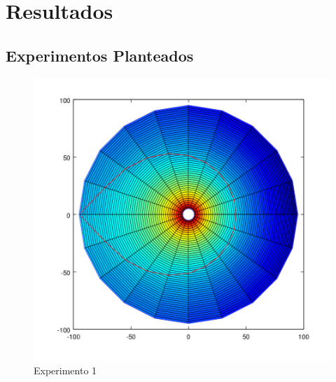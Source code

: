 \section{Resultados}

\subsection{Experimentos Planteados}



\begin{figure}
  \vspace{-20pt}
  \begin{center}
    \includegraphics[scale= 0.4]{imagenes/hornoColorSubeBajaConIsoterma.png}
  \end{center}
  \vspace{-20pt}
  \caption{Experimento 1}
  \vspace{-10pt}
  \label{fig:Exp1}
\end{figure}

